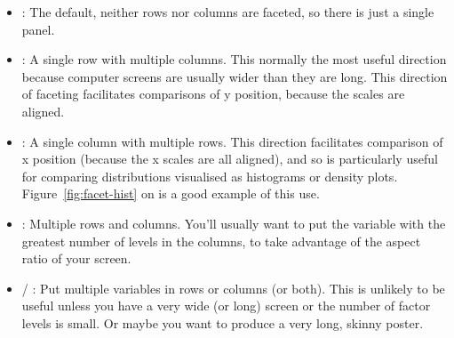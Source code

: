 \begin{itemize}
  \item {}: The default, neither rows nor columns are faceted, so there is just a single panel.

    


  \item {}: A single row with multiple columns.  This normally the most useful direction because computer screens are usually wider than they are long.  This direction of faceting facilitates comparisons of y position, because the scales are aligned.

    
  
  \item {}: A single column with multiple rows.  This direction facilitates comparison of x position (because the x scales are all aligned), and so is particularly useful for comparing distributions visualised as histograms or density plots.  Figure~\ref{fig:facet-hist} on \pageref{fig:facet-hist} is a good example of this use.

    

  \item {}: Multiple rows and columns.  You'll usually want to put the variable with the greatest number of levels in the columns, to take advantage of the aspect ratio of your screen.

    

  \item {} / :  Put multiple variables in rows or columns (or both). This is unlikely to be useful unless you have a very wide (or long) screen or the number of factor levels is small.  Or maybe you want to produce a very long, skinny poster.

    

\end{itemize}

